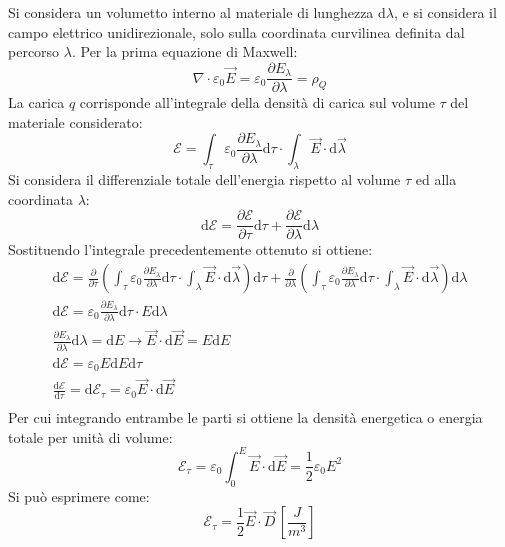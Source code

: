 \documentclass{article}
\newcommand{\df}{\mathrm{d}}
\numberwithin{equation}{subsection}
\begin{document}
Si considera un volumetto interno al materiale di lunghezza $\df\lambda$, e si considera il campo elettrico unidirezionale, solo sulla coordinata curvilinea definita dal 
percorso $\lambda$. Per la prima equazione di Maxwell:
\begin{equation*}
    \nabla\cdot\varepsilon_0\vec{E}=\varepsilon_0\displaystyle\frac{\partial E_{\lambda}}{\partial\lambda}=\rho_Q
\end{equation*}
La carica $q$ corrisponde all'integrale della densità di carica sul volume $\tau$ del materiale considerato:
\begin{equation*}
    \mathscr{E}=\displaystyle\int_{\tau}\varepsilon_0\frac{\partial E_{\lambda}}{\partial\lambda}\df\tau\cdot\int_{\lambda}\vec{E}\cdot \df\vec{\lambda}
\end{equation*}
Si considera il differenziale totale dell'energia rispetto al volume $\tau$ ed alla coordinata $\lambda$:
\begin{equation*}
    \df\mathscr{E}=\displaystyle\frac{\partial \mathscr{E}}{\partial \tau}\df\tau+\frac{\partial\mathscr{E}}{\partial \lambda}\df\lambda
\end{equation*}
Sostituendo l'integrale precedentemente ottenuto si ottiene:
\begin{gather*}
    \df\mathscr{E}=\frac{\partial}{\partial \tau}\left(\displaystyle\int_{\tau}\varepsilon_0\frac{\partial E_{\lambda}}{\partial\lambda}\df\tau\cdot\int_{\lambda}\vec{E}\cdot \df\vec{\lambda}\right)\df\tau+\frac{\partial}{\partial \lambda}\left(\displaystyle\int_{\tau}\varepsilon_0\frac{\partial E_{\lambda}}{\partial\lambda}\df\tau\cdot\int_{\lambda}\vec{E}\cdot \df\vec{\lambda}\right)\df\lambda\\
    \df\mathscr{E}=\displaystyle\varepsilon_0\frac{\partial E_{\lambda}}{\partial\lambda}\df\tau\cdot E\df\lambda\\
    \displaystyle\frac{\partial E_{\lambda}}{\partial \lambda}\df\lambda=\df E\to\vec{E}\cdot \df\vec{E}=E\df E\\
    \df\mathscr{E}=\varepsilon_0E\df E\df\tau\\
    \frac{\df\mathscr{E}}{\df\tau}=\df\mathscr{E}_{\tau}=\varepsilon_0\vec{E}\cdot \df\vec{E}\\
\end{gather*}
Per cui integrando entrambe le parti si ottiene la densità energetica o energia totale per unità di volume:
\begin{equation*}
    \mathscr{E}_\tau=\varepsilon_0\displaystyle\int_{0}^E\vec{E}\cdot \df\vec{E}=\frac{1}{2}\varepsilon_0E^2
\end{equation*}
Si può esprimere come:
\begin{equation}
    \mathscr{E}_{\tau}=\displaystyle\frac{1}{2}\vec{E}\cdot\vec{D}\,\left[\frac{J}{m^3}\right]
\end{equation}
\end{document}
